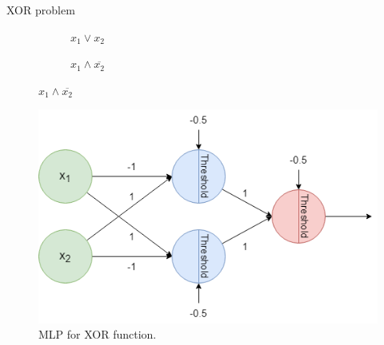\begin{frame}{XOR problem}
\begin{figure}
\begin{subfigure}[b]{0.25\textwidth}
            \caption{$x_1 \vee x_2$}
        \end{subfigure}
        \hspace*{0.5em}
        \begin{subfigure}[b]{0.25\textwidth}
            \centering
            \caption{$x_1 \wedge \overline{x_2}$}
        \end{subfigure}
    \end{figure}
    \pause
    \begin{figure}[H]
        \centering
        \includegraphics[height=0.35\textheight]{Figs/xor_gate.png}
        \caption{MLP for XOR function.}
    \end{figure}
\end{frame}



